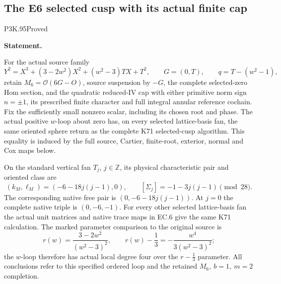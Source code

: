\subsection{The E6 selected cusp with its actual finite cap}
\begin{statement}{P3K.95}{Proved}
\par\medskip\noindent\textbf{Statement.}\par\nopagebreak[4]

For the actual source family
\[
 Y^2=X^3+(3-2w^2)X^2+(w^2-3)TX+T^2,\qquad
 G=(0,T),\qquad q=T-(w^2-1),
\]
retain \(M_6=\mathcal O(6G-O)\), source suspension by \(-G\),
the complete selected-zero Hom section, and the quadratic reduced-IV
cap with either primitive norm sign \(n=\pm1\), its prescribed
finite character and full integral annular reference cochain.
Fix the sufficiently small nonzero scalar, including its chosen
root and phase. The actual positive \(w\)-loop about zero has,
on every selected lattice-basis fan, the same oriented sphere return
as the complete K71 selected-cusp algorithm. This equality is
induced by the full source, Cartier, finite-root, exterior, normal
and Cox maps below.

On the standard vertical fan \(T_j\), \(j\in\mathbb Z\), its
physical characteristic pair and oriented class are
\[
 (k_M,\ell_M)=(-6-18j(j-1),0),\qquad
 [\Sigma_j]=-1-3j(j-1)\pmod {28}.
\]
The corresponding native free pair is
\((0,-6-18j(j-1))\). At \(j=0\) the complete native triple is
\((0,-6,-1)\). For every other selected lattice-basis fan the
actual unit matrices and native trace maps in EC.6 give the same
K71 calculation. The marked parameter comparison to the original
source is
\[
 r(w)=\frac{3-2w^2}{(w^2-3)^2},\qquad
 r(w)-\frac13=-\frac{w^4}{3(w^2-3)^2};
\]
the \(w\)-loop therefore has actual local degree four over the
\(r-\tfrac13\) parameter. All conclusions refer to this specified
ordered loop and the retained \(M_6,\ b=1,\ m=2\) completion.

\end{statement}

